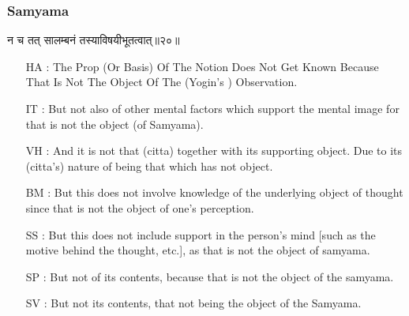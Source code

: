 \begin{frame}[fragile]\frametitle{Samyama}
\begin{sanskrit}
न च तत् सालम्बनं तस्याविषयीभूतत्वात्॥२०॥
\end{sanskrit}

	\begin{itemize}
	\item [HA]: The Prop (Or Basis) Of The Notion Does Not Get Known Because That Is Not The Object Of The (Yogin’s ) Observation.
	\item [IT]: But not also of other mental factors which support the mental image for that is not the object (of Samyama).
	\item [VH]: And it is not that (citta) together with its supporting object. Due to its (citta’s) nature of being that which has not object.
	\item [BM]: But this does not involve knowledge of the underlying object of thought since that is not the object of one’s perception.
	\item [SS]: But this does not include support in the person’s mind [such as the motive behind the thought, etc.], as that is not the object of samyama.
	\item [SP]: But not of its contents, because that is not the object of the samyama.
	\item [SV]: But not its contents, that not being the object of the Samyama. 
	\end{itemize}
\end{frame}

